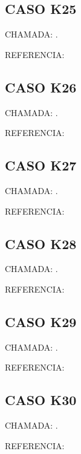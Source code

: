 \documentclass{undftex}
\begin{document}
\begin{refsection}\section*{CASO K25} CHAMADA: . \textcite{k25}\par REFERENCIA:\par\printbibliography[heading=none,check=undfconsultadas]\end{refsection}\clearpage
\begin{refsection}\section*{CASO K26} CHAMADA: . \textcite{k26}\par REFERENCIA:\par\printbibliography[heading=none,check=undfconsultadas]\end{refsection}\clearpage
\begin{refsection}\section*{CASO K27} CHAMADA: . \textcite{k27}\par REFERENCIA:\par\printbibliography[heading=none,check=undfconsultadas]\end{refsection}\clearpage
\begin{refsection}\section*{CASO K28} CHAMADA: . \textcite{k28}\par REFERENCIA:\par\printbibliography[heading=none,check=undfconsultadas]\end{refsection}\clearpage
\begin{refsection}\section*{CASO K29} CHAMADA: . \textcite{k29}\par REFERENCIA:\par\printbibliography[heading=none,check=undfconsultadas]\end{refsection}\clearpage
\begin{refsection}\section*{CASO K30} CHAMADA: . \textcite{k30}\par REFERENCIA:\par\printbibliography[heading=none,check=undfconsultadas]\end{refsection}\clearpage
\end{document}
